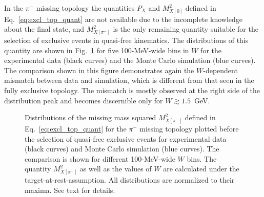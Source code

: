 In the $\pi^{-}$ missing topology the quantities $P_{X}$ and $M^{2}_{X[0]}$ defined in Eq.~\eqref{eq:excl_top_quant} are not available due to the incomplete knowledge about the final state, and $M_{X[\pi^{-}]}^{2}$ is the only remaining quantity suitable for the selection of exclusive events in quasi-free kinematics. The distributions of this quantity are shown in Fig.~\ref{fig:main_top_mm2} for five 100-MeV-wide bins in $W$ for the experimental data (black curves) and the Monte Carlo simulation (blue curves). The comparison shown in this figure demonstrates again the $W$-dependent mismatch between data and simulation, which is different from that seen in the fully exclusive topology. The mismatch is mostly observed at the right side of the distribution peak and becomes discernible only for $W\gtrsim 1.5$~GeV.
\begin{figure}[!ht]
\begin{center}
\end{center}
\caption{\small Distributions of the missing mass squared $M^{2}_{X[\pi^{-}]}$ defined in Eq.~\eqref{eq:excl_top_quant} for the $\pi^{-}$ missing topology plotted before the selection of quasi-free exclusive events for experimental data (black curves) and Monte Carlo simulation (blue curves). The comparison is shown for different 100-MeV-wide $W$ bins. The quantity $M^{2}_{X[\pi^{-}]}$ as well as the values of $W$ are calculated under the target-at-rest-assumption. All distributions are normalized to their maxima. See text for details. }
\label{fig:main_top_mm2}
\end{figure}

